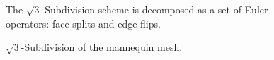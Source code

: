 \begin{figure}[htb]
    \caption{The $\sqrt{3}$-Subdivision scheme is decomposed as
             a set of Euler operators: face splits and edge flips.}
    \label{fig:sqrt3_basic}
\end{figure}

\begin{figure}[htb]
    \caption{$\sqrt{3}$-Subdivision of the mannequin mesh.}
    \label{fig:sqrt3}
\end{figure}


